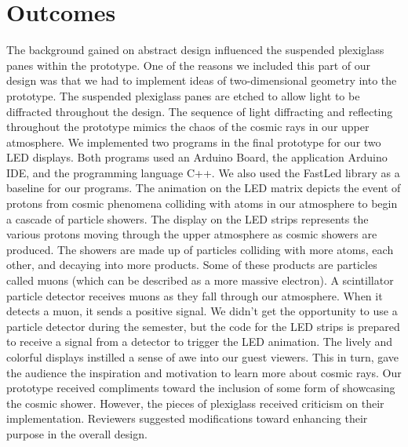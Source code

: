 \documentclass{article}
\begin{document}
\section{Outcomes}
The background gained on abstract design influenced the suspended plexiglass panes within the prototype. One of the reasons we included this part of our design was that we had to implement ideas of two-dimensional geometry into the prototype. The suspended plexiglass panes are etched to allow light to be diffracted throughout the design. The sequence of light diffracting and reflecting throughout the prototype mimics the chaos of the cosmic rays in our upper atmosphere. We implemented two programs in the final prototype for our two LED displays. Both programs used an Arduino Board, the application Arduino IDE, and the programming language C++. We also used the FastLed library as a baseline for our programs. The animation on the LED matrix depicts the event of protons from cosmic phenomena colliding with atoms in our atmosphere to begin a cascade of particle showers. The display on the LED strips represents the various protons moving through the upper atmosphere as cosmic showers are produced. The showers are made up of particles colliding with more atoms, each other, and decaying into more products. Some of these products are particles called muons (which can be described as a more massive electron). A scintillator particle detector receives muons as they fall through our atmosphere. When it detects a muon, it sends a positive signal. We didn’t get the opportunity to use a particle detector during the semester, but the code for the LED strips is prepared to receive a signal from a detector to trigger the LED animation. The lively and colorful displays instilled a sense of awe into our guest viewers. This in turn, gave the audience the inspiration and motivation to learn more about cosmic rays. Our prototype received compliments toward the inclusion of some form of showcasing the cosmic shower. However, the pieces of plexiglass received criticism on their implementation. Reviewers suggested modifications toward enhancing their purpose in the overall design.
\end{document}
